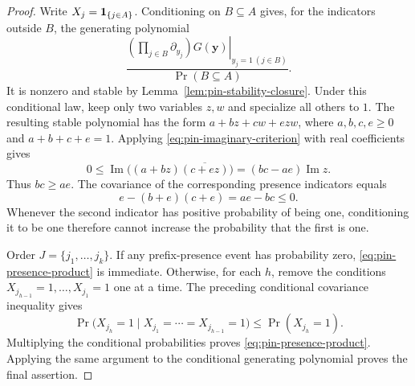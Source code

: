\begin{proof}
Write $X_j=\mathbf 1_{\{j\in A\}}$.  Conditioning on $B\subseteq A$ gives,
for the indicators outside $B$, the generating polynomial
\[
 \frac{\left.\left(\prod_{j\in B}\partial_{y_j}\right)
                       G(\boldsymbol y)\right|_{y_j=1\ (j\in B)}}
      {\Pr(B\subseteq A)}.
\]
It is nonzero and stable by Lemma~\ref{lem:pin-stability-closure}.
Under this conditional law, keep only two variables $z,w$ and
specialize all others to $1$.  The resulting stable polynomial has
the form $a+bz+cw+ezw$, where $a,b,c,e\ge0$ and
$a+b+c+e=1$.  Applying \eqref{eq:pin-imaginary-criterion} with real
coefficients gives
\[
   0\le\operatorname{Im}\bigl((a+bz)\overline{(c+ez)}\bigr)
                 =(bc-ae)\operatorname{Im}z.
\]
Thus $bc\ge ae$.  The covariance of the corresponding presence
indicators equals
\[
                  e-(b+e)(c+e)=ae-bc\le0.
\]
Whenever the second indicator has positive probability of being one,
conditioning it to be one therefore cannot increase the probability
that the first is one.

Order $J=\{j_1,\ldots,j_k\}$.  If any prefix-presence event has
probability zero, \eqref{eq:pin-presence-product} is immediate.
Otherwise, for each $h$, remove the conditions
$X_{j_{h-1}}=1,\ldots,X_{j_1}=1$ one at a time.  The preceding
conditional covariance inequality gives
\[
 \Pr\bigl(X_{j_h}=1\mid X_{j_1}=\cdots=X_{j_{h-1}}=1\bigr)
                        \le \Pr(X_{j_h}=1).
\]
Multiplying the conditional probabilities proves
\eqref{eq:pin-presence-product}.  Applying the same argument to the
conditional generating polynomial proves the final assertion.
\end{proof}

